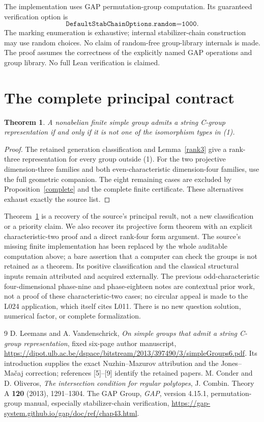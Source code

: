 \documentclass[11pt,a4paper]{article}
\newtheorem{theorem}{Theorem}\newtheorem{lemma}[theorem]{Lemma}\newtheorem{proposition}[theorem]{Proposition}
\begin{document}
The implementation uses GAP permutation-group computation. Its guaranteed
verification option is
\[
 \texttt{DefaultStabChainOptions.random=1000}.
\]
The marking enumeration is exhaustive; internal stabilizer-chain
construction may use random choices. No claim of random-free group-library
internals is made. The proof assumes the correctness of the explicitly named
GAP operations and group library. No full Lean verification is claimed.

\section{The complete principal contract}
\begin{theorem}\label{classification}
A nonabelian finite simple group admits a string C-group representation if
and only if it is not one of the isomorphism types in (1).
\end{theorem}
\begin{proof}
The retained generation classification and Lemma~\ref{rank3} give a
rank-three representation for every group outside (1). For the two
projective dimension-three families and both even-characteristic
dimension-four families, use the full geometric companion. The eight
remaining cases are excluded by Proposition~\ref{complete} and the complete
finite certificate. These alternatives exhaust exactly the source list.
\end{proof}

Theorem~\ref{classification} is a recovery of the source's principal result,
not a new classification or a priority claim. We also recover its projective
form theorem with an explicit characteristic-two proof and a direct rank-four
form argument. The source's missing finite implementation has been replaced
by the whole auditable computation above; a bare assertion that a computer
can check the groups is not retained as a theorem. Its positive classification
and the classical structural inputs remain attributed and acquired externally.
The previous odd-characteristic four-dimensional phase-nine and phase-eighteen
notes are contextual prior work, not a proof of these characteristic-two cases;
no circular appeal is made to the L024 application, which itself cites L011.
There is no new question solution, numerical factor, or complete formalization.

\begin{thebibliography}{9}
 D. Leemans and A. Vandenschrick, \emph{On simple groups that admit
a string C-group representation}, fixed six-page author manuscript,
\url{https://dipot.ulb.ac.be/dspace/bitstream/2013/397490/3/simpleGroups6.pdf}.
Its introduction supplies the exact Nuzhin--Mazurov attribution and the
Jones--Ma\v caj correction; references [5]--[9] identify the retained papers.
 M. Conder and D. Oliveros, \emph{The intersection condition for
regular polytopes}, J. Combin. Theory A \textbf{120} (2013), 1291--1304.
 The GAP Group, \emph{GAP}, version 4.15.1, permutation-group
manual, especially stabilizer-chain verification,
\url{https://gap-system.github.io/gap/doc/ref/chap43.html}.
\end{thebibliography}
\end{document}
